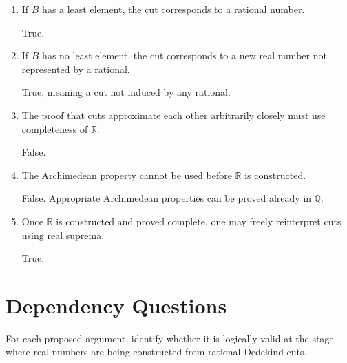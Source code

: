 \documentclass{essay}
\begin{document}
\begin{enumerate}[label=\arabic*., itemsep=10pt]
\item If $B$ has a least element, the cut corresponds to a rational number.

\begin{answer}
True.
\end{answer}

\item If $B$ has no least element, the cut corresponds to a new real number not represented by a rational.

\begin{answer}
True, meaning a cut not induced by any rational.
\end{answer}

\item The proof that cuts approximate each other arbitrarily closely must use completeness of $\mathbb{R}$.

\begin{answer}
False.
\end{answer}

\item The Archimedean property cannot be used before $\mathbb{R}$ is constructed.

\begin{answer}
False. Appropriate Archimedean properties can be proved already in $\mathbb{Q}$.
\end{answer}

\item Once $\mathbb{R}$ is constructed and proved complete, one may freely reinterpret cuts using real suprema.

\begin{answer}
True.
\end{answer}

\end{enumerate}

\section{Dependency Questions}

For each proposed argument, identify whether it is logically valid at the stage where real numbers are being constructed from rational Dedekind cuts.
\end{document}
